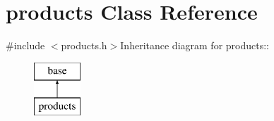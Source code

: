 \hypertarget{classproducts}{
\section{products Class Reference}
\label{classproducts}
}


{\ttfamily \#include $<$products.h$>$}Inheritance diagram for products::\begin{figure}[H]
\begin{center}
\leavevmode
\includegraphics[height=2cm]{classproducts}
\end{center}
\end{figure}
